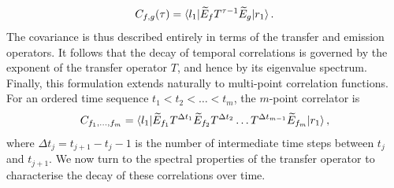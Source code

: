 \begin{equation}\label{eq:covariance_operator}
    C_{f,g}(\tau) = \braket{l_1|\widetilde{E}_f T^{\tau - 1} \widetilde{E}_g|r_1}.
\end{equation}
The covariance is thus described entirely in terms of the transfer and emission operators. It follows that the decay of temporal correlations is governed by the exponent of the transfer operator \(T\), and hence by its eigenvalue spectrum. Finally, this formulation extends naturally to multi-point correlation functions. For an ordered time sequence \(t_1 < t_2 < \dots < t_m\), the \(m\)-point correlator is
\begin{equation}
    C_{f_1,\dots,f_m} = \braket{l_1|\widetilde{E}_{f_1} T^{\Delta t_1} \widetilde{E}_{f_2} T^{\Delta t_2} \dots T^{\Delta t_{m-1}}\widetilde{E}_{f_m}|r_1},
\end{equation}
where \(\Delta t_j = t_{j+1} - t_j - 1\) is the number of intermediate time steps between \(t_j\) and \(t_{j+1}\). We now turn to the spectral properties of the transfer operator to characterise the decay of these correlations over time.


